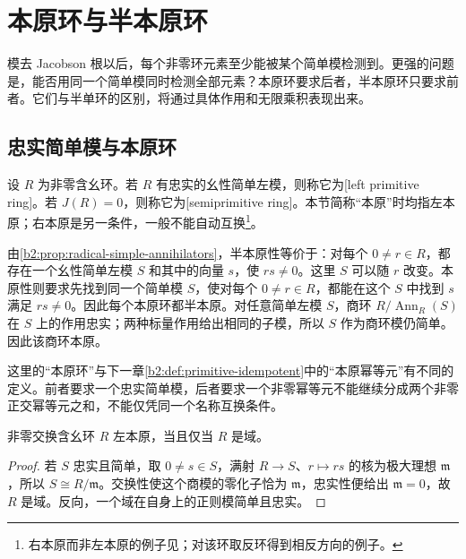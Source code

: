
\section{本原环与半本原环}
\label{b2:sec:1403}

模去 Jacobson 根以后，每个非零环元素至少能被某个简单模检测到。更强的问题是，能否用同一个简单模同时检测全部元素？本原环要求后者，半本原环只要求前者。它们与半单环的区别，将通过具体作用和无限乘积表现出来。

%
%

\subsection{忠实简单模与本原环}
\label{b2:subsec:1403:01}

\begin{definition}\label{b2:def:primitive-semiprimitive}
	设 \(R\) 为非零含幺环。若 \(R\) 有忠实的幺性简单左模，则称它为[left primitive ring]。若 \(J(R)=0\)，则称它为[semiprimitive ring]。本节简称“本原”时均指左本原；右本原是另一条件，一般不能自动互换\footnote{右本原而非左本原的例子见\cite[pp. 473--475]{Bergman1964PrimitiveOneSided}；对该环取反环得到相反方向的例子。}。
\end{definition}

由\cref{b2:prop:radical-simple-annihilators}，半本原性等价于：对每个 \(0\ne r\in R\)，都存在一个幺性简单左模 \(S\) 和其中的向量 \(s\)，使 \(rs\ne0\)。这里 \(S\) 可以随 \(r\) 改变。本原性则要求先找到同一个简单模 \(S\)，使对每个 \(0\ne r\in R\)，都能在这个 \(S\) 中找到 \(s\) 满足 \(rs\ne0\)。因此每个本原环都半本原。对任意简单左模 \(S\)，商环 \(R/\operatorname{Ann}_R(S)\) 在 \(S\) 上的作用忠实；两种标量作用给出相同的子模，所以 \(S\) 作为商环模仍简单。因此该商环本原。

\ProseParagraphBreak
这里的“本原环”与下一章\cref{b2:def:primitive-idempotent}中的“本原幂等元”有不同的定义。前者要求一个忠实简单模，后者要求一个非零幂等元不能继续分成两个非零正交幂等元之和，不能仅凭同一个名称互换条件。

\begin{proposition}\label{b2:prop:commutative-primitive-field}
	非零交换含幺环 \(R\) 左本原，当且仅当 \(R\) 是域。
\end{proposition}
\begin{proof}
	若 \(S\) 忠实且简单，取 \(0\ne s\in S\)，满射 \(R\to S\)、\(r\mapsto rs\) 的核为极大理想 \(\mathfrak m\)，所以 \(S\cong R/\mathfrak m\)。交换性使这个商模的零化子恰为 \(\mathfrak m\)，忠实性便给出 \(\mathfrak m=0\)，故 \(R\) 是域。反向，一个域在自身上的正则模简单且忠实。
\end{proof}

